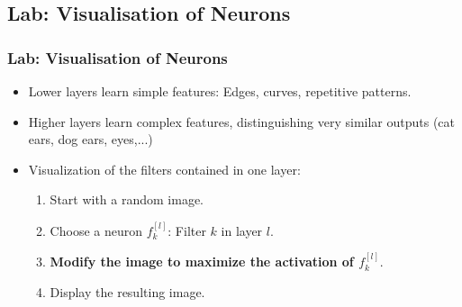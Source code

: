 \documentclass[10pt,hyperref={pdfpagelabels=false}]{beamer}
\begin{document}
\subsection{Lab: Visualisation of Neurons}
\begin{frame}
    \frametitle{Lab: Visualisation of Neurons}
    \begin{itemize}
        \item Lower layers learn simple features: Edges, curves, repetitive patterns.
        \item Higher layers learn complex features, distinguishing very similar outputs (cat ears, dog ears, eyes,...)
        \item Visualization of the filters contained in one layer:
        \begin{enumerate}
            \item Start with a random image.
            \item Choose a neuron $f_{k}^{[l]}$: Filter $k$ in layer $l$.
            \item {\bf Modify the image to maximize the activation of $f_{k}^{[l]}$}.
            \item Display the resulting image.
        \end{enumerate}
    \end{itemize}
\end{frame}
\end{document}
